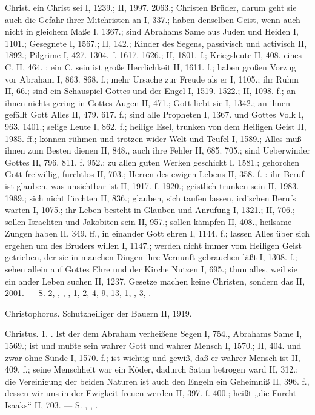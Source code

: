 Christ.  ein Christ sei I, 1239.; II, 1997. 2063.; Christen  Brüder, darum geht sie auch die Gefahr ihrer Mitchristen an I, 337.; haben denselben Geist, wenn auch nicht in gleichem Maße I, 1367.; sind Abrahams Same aus Juden und Heiden I, 1101.; Gesegnete I, 1567.; II, 142.; Kinder des Segens, passivisch und activisch II, 1892.; Pilgrime I, 427. 1304. f. 1617. 1626.; II, 1801. f.; Kriegsleute II, 408.  eines C. II, 464. : ein C. sein ist große Herrlichkeit II, 1611. f.; haben großen Vorzug vor Abraham I, 863. 868. f.; mehr Ursache zur Freude als er I, 1105.; ihr Ruhm II, 66.; sind ein Schauspiel Gottes und der Engel I, 1519. 1522.; II, 1098. f.; an ihnen nichts gering in Gottes Augen II, 471.; Gott liebt sie I, 1342.; an ihnen gefällt Gott Alles II, 479. 617. f.; sind alle Propheten I, 1367. und Gottes Volk I, 963. 1401.; selige Leute I, 862. f.; heilige Esel, trunken von dem Heiligen Geist II, 1985. ff.; können rühmen und trotzen wider Welt und Teufel I, 1589.; Alles muß ihnen zum Besten dienen II, 848., auch ihre Fehler II, 685. 705.; sind Ueberwinder Gottes II, 796. 811. f. 952.; zu allen guten Werken geschickt I, 1581.; gehorchen Gott freiwillig, furchtlos II, 703.; Herren des ewigen Lebens II, 358. f. : ihr Beruf ist glauben, was unsichtbar ist II, 1917. f. 1920.; geistlich trunken sein II, 1983. 1989.; sich nicht fürchten II, 836.; glauben, sich taufen lassen, irdischen Berufs warten I, 1075.; ihr Leben besteht in Glauben und Anrufung I, 1321.; II, 706.; sollen Israeliten und Jakobiten sein II, 957.; sollen kämpfen II, 408., heilsame Zungen haben II, 349. ff., in einander Gott ehren I, 1144. f.; lassen Alles über sich ergehen um des Bruders willen I, 1147.; werden nicht immer vom Heiligen Geist getrieben, der sie in manchen Dingen ihre Vernunft gebrauchen läßt I, 1308. f.; sehen allein auf Gottes Ehre und der Kirche Nutzen I, 695.; thun alles, weil sie ein ander Leben suchen II, 1237. Gesetze machen keine Christen, sondern das  II, 2001. — S.  2, , , ,  1,  2, 4,  9,  13,  1, ,  3, .

Christophorus. Schutzheiliger der Bauern II, 1919.

Christus. 1. . Ist der dem Abraham verheißene Segen I, 754., Abrahams Same I, 1569.; ist und mußte sein wahrer Gott und wahrer Mensch I, 1570.; II, 404. und zwar ohne Sünde I, 1570. f.; ist wichtig und gewiß, daß er wahrer Mensch ist II, 409. f.; seine Menschheit war ein Köder, dadurch Satan betrogen ward II, 312.; die Vereinigung der beiden Naturen ist auch den Engeln ein Geheimniß II, 396. f., dessen wir uns in der Ewigkeit freuen werden II, 397. f. 400.; heißt „die Furcht Isaaks“ II, 703. — S. , , .

